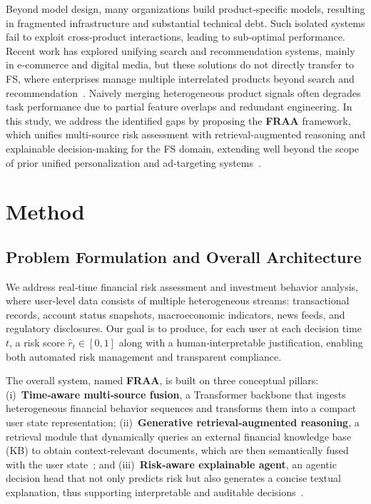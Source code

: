 \documentclass[10pt,twocolumn]{article}
\begin{document}
Beyond model design, many organizations build product‑specific models, resulting in fragmented infrastructure and substantial technical debt. 
Such isolated systems fail to exploit cross‑product interactions, leading to sub‑optimal performance. 
Recent work has explored unifying search and recommendation systems, mainly in e‑commerce and digital media, but these solutions do not directly transfer to FS, where enterprises manage multiple interrelated products beyond search and recommendation~\cite{arxiv-2512.09458,arxiv-2512.08769,arxiv-2512.12791}. 
Naively merging heterogeneous product signals often degrades task performance due to partial feature overlaps and redundant engineering. 
In this study, we address the identified gaps by proposing the \textbf{FRAA} framework, which unifies multi-source risk assessment with retrieval-augmented reasoning and explainable decision-making for the FS domain, extending well beyond the scope of prior unified personalization and ad-targeting systems~\cite{arxiv-2511.04700,arxiv-2510.15552,arxiv-2511.01059,arxiv-2511.14010}.

\section{Method}

\subsection{Problem Formulation and Overall Architecture}

We address real‑time financial risk assessment and investment behavior analysis, where user‑level data consists of multiple heterogeneous streams: transactional records, account status snapshots, macroeconomic indicators, news feeds, and regulatory disclosures. Our goal is to produce, for each user at each decision time $t$, a risk score $\hat{r}_t \in [0,1]$ along with a human‑interpretable justification, enabling both automated risk management and transparent compliance.

The overall system, named \textbf{FRAA}, is built on three conceptual pillars: (i)~\textbf{Time‑aware multi‑source fusion}, a Transformer backbone that ingests heterogeneous financial behavior sequences and transforms them into a compact user state representation; (ii)~\textbf{Generative retrieval‑augmented reasoning}, a retrieval module that dynamically queries an external financial knowledge base (KB) to obtain context‑relevant documents, which are then semantically fused with the user state~\cite{arxiv-2511.04720,arxiv-2511.03261,arxiv-2510.08149}; and (iii)~\textbf{Risk‑aware explainable agent}, an agentic decision head that not only predicts risk but also generates a concise textual explanation, thus supporting interpretable and auditable decisions~\cite{arxiv-2512.09706,arxiv-2512.08659,arxiv-2512.10304}.
\end{document}
